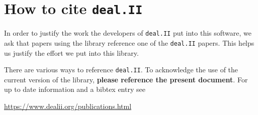 \documentclass{ansarticle-preprint}
\newcommand{\specialword}[1]{\texttt{#1}}
\newcommand{\dealii}{{\specialword{deal.II}}\xspace}
\begin{document}
\section{How to cite \dealii}\label{sec:cite}

In order to justify the work the developers of \dealii{} put into this
software, we ask that papers using the library reference one of the
\dealii{} papers. This helps us justify the effort we put into this library.

There are various ways to reference \dealii{}. To acknowledge the use of
the current version of the library, \textbf{please reference the present
  document}. For up to date information and a bibtex entry
see
\begin{center}
  \url{https://www.dealii.org/publications.html}
\end{center}
\end{document}
